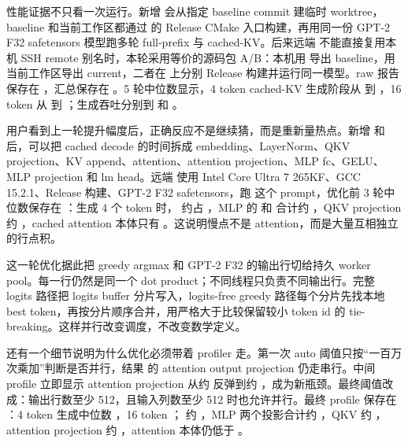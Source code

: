 性能证据不只看一次运行。新增  会从指定 baseline commit 建临时 worktree，baseline 和当前工作区都通过  的 Release CMake 入口构建，再用同一份 GPT-2 F32 safetensors 模型跑多轮 full-prefix 与 cached-KV。后来远端  不能直接复用本机 SSH remote 别名时，本轮采用等价的源码包 A/B：本机用  导出 baseline，用当前工作区导出 current，二者在  上分别 Release 构建并运行同一模型。raw 报告保存在 ，汇总保存在 。5 轮中位数显示，4 token cached-KV 生成阶段从  到 ，16 token 从  到 ；生成吞吐分别到  和 。

用户看到上一轮提升幅度后，正确反应不是继续猜，而是重新量热点。新增  和  后，可以把 cached decode 的时间拆成 embedding、LayerNorm、QKV projection、KV append、attention、attention projection、MLP fc、GELU、MLP projection 和 lm head。远端  使用 Intel Core Ultra 7 265KF、GCC 15.2.1、Release 构建、GPT-2 F32 safetensors，跑  这个 prompt，优化前 3 轮中位数保存在 ：生成 4 个 token 时， 约占 ，MLP 的  和  合计约 ，QKV projection 约 ，cached attention 本体只有 。这说明慢点不是 attention，而是大量互相独立的行点积。

这一轮优化据此把  greedy argmax 和 GPT-2 F32  的输出行切给持久 worker pool。每一行仍然是同一个 dot product；不同线程只负责不同输出行。完整 logits 路径把 logits buffer 分片写入，logits-free greedy 路径每个分片先找本地 best token，再按分片顺序合并，用严格大于比较保留较小 token id 的 tie-breaking。这样并行改变调度，不改变数学定义。

还有一个细节说明为什么优化必须带着 profiler 走。第一次 auto 阈值只按“一百万次乘加”判断是否并行，结果  的 attention output projection 仍走串行。中间 profile 立即显示 attention projection 从约  反弹到约 ，成为新瓶颈。最终阈值改成：输出行数至少 512，且输入列数至少 512 时也允许并行。最终 profile 保存在 ：4 token 生成中位数 ，16 token ； 约 ，MLP 两个投影合计约 ，QKV 约 ，attention projection 约 ，attention 本体仍低于 。

